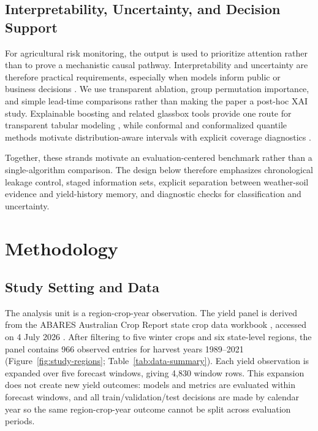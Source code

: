 \documentclass[wcp]{jmlr}
\begin{document}
\subsection{Interpretability, Uncertainty, and Decision Support}
\vspace{-0.6em}

For agricultural risk monitoring, the output is used to prioritize attention rather than to prove a mechanistic causal pathway. Interpretability and uncertainty are therefore practical requirements, especially when models inform public or business decisions \citep{rudin2022blackboxBrief,paudel2023interpretability}. We use transparent ablation, group permutation importance, and simple lead-time comparisons rather than making the paper a post-hoc XAI study. Explainable boosting and related glassbox tools provide one route for transparent tabular modeling \citep{nori2019interpretml}, while conformal and conformalized quantile methods motivate distribution-aware intervals with explicit coverage diagnostics \citep{romano2019cqr,angelopoulos2023conformal}.

\vspace{0.3em}
Together, these strands motivate an evaluation-centered benchmark rather than a single-algorithm comparison. The design below therefore emphasizes chronological leakage control, staged information sets, explicit separation between weather-soil evidence and yield-history memory, and diagnostic checks for classification and uncertainty.

\vspace{-0.8em}
\section{Methodology}
\vspace{-0.4em}

\subsection{Study Setting and Data}
\vspace{-0.3em}

The analysis unit is a region-crop-year observation. The yield panel is derived from the ABARES Australian Crop Report state crop data workbook , accessed on 4 July 2026 \citep{abares2026australianCropReport}. After filtering to five winter crops and six state-level regions, the panel contains 966 observed entries for harvest years 1989--2021 (Figure~\ref{fig:study-regions}; Table~\ref{tab:data-summary}). Each yield observation is expanded over five forecast windows, giving 4,830 window rows. This expansion does not create new yield outcomes: models and metrics are evaluated within forecast windows, and all train/validation/test decisions are made by calendar year so the same region-crop-year outcome cannot be split across evaluation periods.
\end{document}
